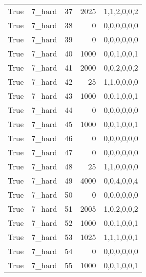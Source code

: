 \begin{tabular}{llrrl}
 True            & 7\_hard              &            37 &                  2025 & 1,1,2,0,0,2   \\
 True            & 7\_hard              &            38 &                     0 & 0,0,0,0,0,0   \\
 True            & 7\_hard              &            39 &                     0 & 0,0,0,0,0,0   \\
 True            & 7\_hard              &            40 &                  1000 & 0,0,1,0,0,1   \\
 True            & 7\_hard              &            41 &                  2000 & 0,0,2,0,0,2   \\
 True            & 7\_hard              &            42 &                    25 & 1,1,0,0,0,0   \\
 True            & 7\_hard              &            43 &                  1000 & 0,0,1,0,0,1   \\
 True            & 7\_hard              &            44 &                     0 & 0,0,0,0,0,0   \\
 True            & 7\_hard              &            45 &                  1000 & 0,0,1,0,0,1   \\
 True            & 7\_hard              &            46 &                     0 & 0,0,0,0,0,0   \\
 True            & 7\_hard              &            47 &                     0 & 0,0,0,0,0,0   \\
 True            & 7\_hard              &            48 &                    25 & 1,1,0,0,0,0   \\
 True            & 7\_hard              &            49 &                  4000 & 0,0,4,0,0,4   \\
 True            & 7\_hard              &            50 &                     0 & 0,0,0,0,0,0   \\
 True            & 7\_hard              &            51 &                  2005 & 1,0,2,0,0,2   \\
 True            & 7\_hard              &            52 &                  1000 & 0,0,1,0,0,1   \\
 True            & 7\_hard              &            53 &                  1025 & 1,1,1,0,0,1   \\
 True            & 7\_hard              &            54 &                     0 & 0,0,0,0,0,0   \\
 True            & 7\_hard              &            55 &                  1000 & 0,0,1,0,0,1   \\

\end{tabular}
